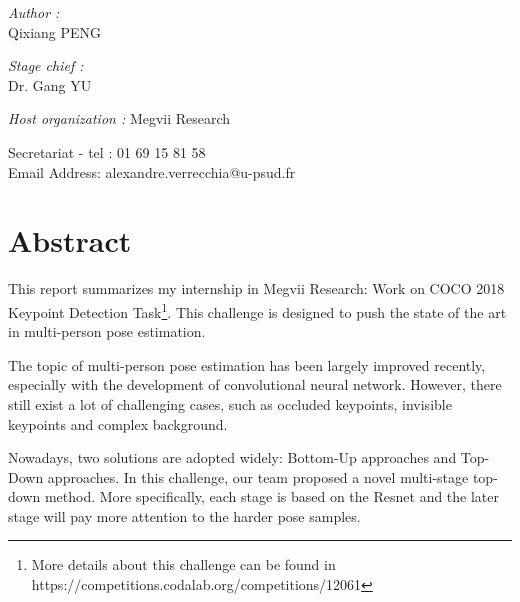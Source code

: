 \documentclass[oneside]{memoir}
\begin{document}
\begin{titlingpage}
\begin{center}
\begin{minipage}{0.4\textwidth}
\begin{flushleft} \large
\emph{Author :}\\
Qixiang \textsc{PENG}
\end{flushleft}
\end{minipage}
\begin{minipage}{0.4\textwidth}
\begin{flushright} \large
\emph{Stage chief :} \\
Dr. Gang \textsc{YU}
\end{flushright}
\end{minipage}
\vfill
\emph{Host organization : }
Megvii Research


\vfill



{Secretariat - tel : 01 69 15 81 58\\
Email Address: alexandre.verrecchia@u-psud.fr\\
}
\end{center}

\end{titlingpage}



\tableofcontents

\newpage
\thispagestyle{empty}%
\newpage

\chapter*{Abstract}

This report summarizes my internship in Megvii Research: Work on COCO 2018 Keypoint Detection Task\footnote{ More details about this challenge can be found in https://competitions.codalab.org/competitions/12061}.
This challenge is designed to push the state of the art in multi-person pose estimation.

The topic of multi-person pose estimation has been largely improved recently, especially with the development of convolutional neural network.
However, there still exist a lot of challenging cases, such as occluded keypoints, invisible keypoints and complex background.

Nowadays, two solutions are adopted widely: Bottom-Up approaches and Top-Down approaches.
In this challenge, our team proposed a novel multi-stage top-down method.
More specifically, each stage is based on the Resnet and the later stage will pay more attention to the harder pose samples.
\end{document}
